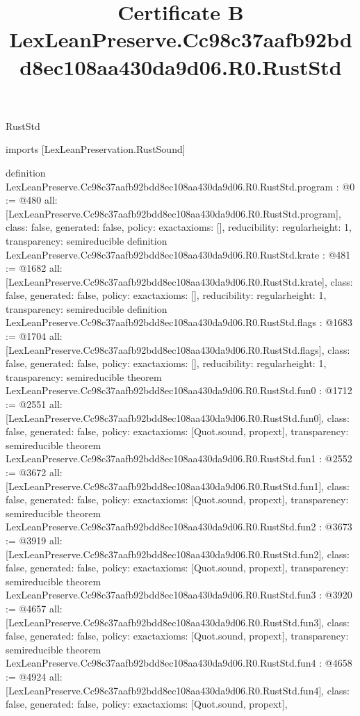 \begin{lexlean}{RustStd}
\title{Certificate B LexLeanPreserve.Cc98c37aafb92bdd8ec108aa430da9d06.R0.RustStd}
\begin{coremodule}
imports [LexLeanPreservation.RustSound]

definition LexLeanPreserve.Cc98c37aafb92bdd8ec108aa430da9d06.R0.RustStd.program : @0 := @480 {
  all: [LexLeanPreserve.Cc98c37aafb92bdd8ec108aa430da9d06.R0.RustStd.program],
  class: false,
  generated: false,
  policy: exact{axioms: []},
  reducibility: regular{height: 1},
  transparency: semireducible
}
definition LexLeanPreserve.Cc98c37aafb92bdd8ec108aa430da9d06.R0.RustStd.krate : @481 := @1682 {
  all: [LexLeanPreserve.Cc98c37aafb92bdd8ec108aa430da9d06.R0.RustStd.krate],
  class: false,
  generated: false,
  policy: exact{axioms: []},
  reducibility: regular{height: 1},
  transparency: semireducible
}
definition LexLeanPreserve.Cc98c37aafb92bdd8ec108aa430da9d06.R0.RustStd.flags : @1683 := @1704 {
  all: [LexLeanPreserve.Cc98c37aafb92bdd8ec108aa430da9d06.R0.RustStd.flags],
  class: false,
  generated: false,
  policy: exact{axioms: []},
  reducibility: regular{height: 1},
  transparency: semireducible
}
theorem LexLeanPreserve.Cc98c37aafb92bdd8ec108aa430da9d06.R0.RustStd.fun0 : @1712 := @2551 {
  all: [LexLeanPreserve.Cc98c37aafb92bdd8ec108aa430da9d06.R0.RustStd.fun0],
  class: false,
  generated: false,
  policy: exact{axioms: [Quot.sound, propext]},
  transparency: semireducible
}
theorem LexLeanPreserve.Cc98c37aafb92bdd8ec108aa430da9d06.R0.RustStd.fun1 : @2552 := @3672 {
  all: [LexLeanPreserve.Cc98c37aafb92bdd8ec108aa430da9d06.R0.RustStd.fun1],
  class: false,
  generated: false,
  policy: exact{axioms: [Quot.sound, propext]},
  transparency: semireducible
}
theorem LexLeanPreserve.Cc98c37aafb92bdd8ec108aa430da9d06.R0.RustStd.fun2 : @3673 := @3919 {
  all: [LexLeanPreserve.Cc98c37aafb92bdd8ec108aa430da9d06.R0.RustStd.fun2],
  class: false,
  generated: false,
  policy: exact{axioms: [Quot.sound, propext]},
  transparency: semireducible
}
theorem LexLeanPreserve.Cc98c37aafb92bdd8ec108aa430da9d06.R0.RustStd.fun3 : @3920 := @4657 {
  all: [LexLeanPreserve.Cc98c37aafb92bdd8ec108aa430da9d06.R0.RustStd.fun3],
  class: false,
  generated: false,
  policy: exact{axioms: [Quot.sound, propext]},
  transparency: semireducible
}
theorem LexLeanPreserve.Cc98c37aafb92bdd8ec108aa430da9d06.R0.RustStd.fun4 : @4658 := @4924 {
  all: [LexLeanPreserve.Cc98c37aafb92bdd8ec108aa430da9d06.R0.RustStd.fun4],
  class: false,
  generated: false,
  policy: exact{axioms: [Quot.sound, propext]},
}
\end{coremodule}
\end{lexlean}

